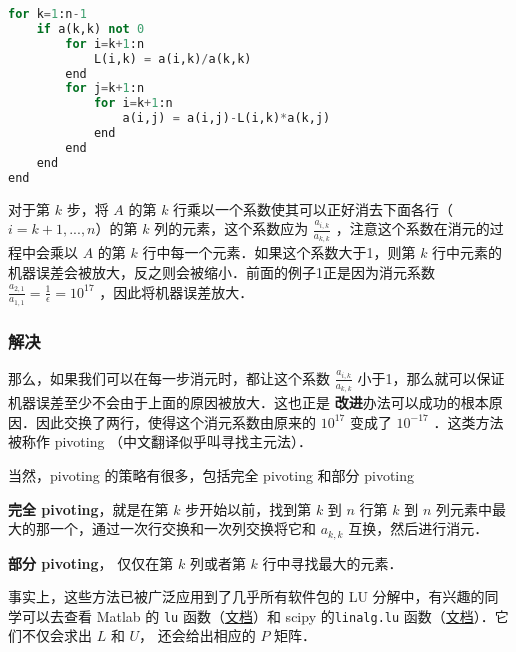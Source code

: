 \begin{lstlisting}[language=python]
for k=1:n-1
    if a(k,k) not 0
        for i=k+1:n
            L(i,k) = a(i,k)/a(k,k)
        end
        for j=k+1:n
            for i=k+1:n
                a(i,j) = a(i,j)-L(i,k)*a(k,j)
            end
        end
    end
end
\end{lstlisting}

对于第  $k$  步，将 $A$  的第  $k$  行乘以一个系数使其可以正好消去下面各行（$i=k+1,...,n$）的第 $k$ 列的元素，这个系数应为  $\frac{a_{i,k}}{a_{k,k}}$  ，注意这个系数在消元的过程中会乘以  $A$  的第  $k $  行中每一个元素．如果这个系数大于1，则第  $k $  行中元素的机器误差会被放大，反之则会被缩小．前面的例子1正是因为消元系数  $\frac{a_{2,1}}{a_{1,1}}=\frac{1}{\epsilon}=10^{17}$  ，因此将机器误差放大．

\subsubsection{解决}

那么，如果我们可以在每一步消元时，都让这个系数  $\frac{a_{i,k}}{a_{k,k}}$ 小于1，那么就可以保证机器误差至少不会由于上面的原因被放大．这也正是	\textbf{改进}办法可以成功的根本原因．因此交换了两行，使得这个消元系数由原来的  $10^{17}$  变成了  $10^{-17}$  ．这类方法被称作 pivoting （中文翻译似乎叫寻找主元法）．

当然，pivoting 的策略有很多，包括完全 pivoting 和部分 pivoting

\textbf{完全 pivoting}，就是在第  $k$ 步开始以前，找到第  $k$  到  $n$  行第  $k$  到  $n$  列元素中最大的那一个，通过一次行交换和一次列交换将它和  $a_{k,k}$  互换，然后进行消元．

\textbf{部分 pivoting}， 仅仅在第 $k$ 列或者第 $k$ 行中寻找最大的元素．

事实上，这些方法已被广泛应用到了几乎所有软件包的 LU 分解中，有兴趣的同学可以去查看 Matlab 的 \verb|lu| 函数（\href{https://ww2.mathworks.cn/help/matlab/ref/lu.html}{文档}）和 scipy 的\verb|linalg.lu| 函数（\href{https://docs.scipy.org/doc/scipy/reference/generated/scipy.linalg.lu.html}{文档}）．它们不仅会求出 $L$ 和 $U$， 还会给出相应的 $P$ 矩阵．
